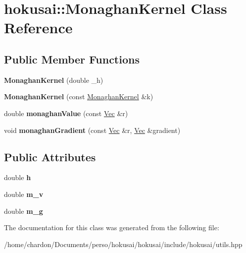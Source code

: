 \hypertarget{classhokusai_1_1MonaghanKernel}{\section{hokusai\+:\+:Monaghan\+Kernel Class Reference}
\label{classhokusai_1_1MonaghanKernel}
}
\subsection*{Public Member Functions}
\begin{DoxyCompactItemize}
\item 
\hypertarget{classhokusai_1_1MonaghanKernel_a5d44cd7ae2e0c0d27bbf3e9dd001ccf3}{{\bfseries Monaghan\+Kernel} (double \+\_\+h)}\label{classhokusai_1_1MonaghanKernel_a5d44cd7ae2e0c0d27bbf3e9dd001ccf3}

\item 
\hypertarget{classhokusai_1_1MonaghanKernel_a0d96366720449895e98773ecc66a8b0c}{{\bfseries Monaghan\+Kernel} (const \hyperlink{classhokusai_1_1MonaghanKernel}{Monaghan\+Kernel} \&k)}\label{classhokusai_1_1MonaghanKernel_a0d96366720449895e98773ecc66a8b0c}

\item 
\hypertarget{classhokusai_1_1MonaghanKernel_ae8b604de820017f1203ddae10d891e45}{double {\bfseries monaghan\+Value} (const \hyperlink{classhokusai_1_1Vec3}{Vec} \&r)}\label{classhokusai_1_1MonaghanKernel_ae8b604de820017f1203ddae10d891e45}

\item 
\hypertarget{classhokusai_1_1MonaghanKernel_ab6fca0322a39129c9566e49cbdc0fd45}{void {\bfseries monaghan\+Gradient} (const \hyperlink{classhokusai_1_1Vec3}{Vec} \&r, \hyperlink{classhokusai_1_1Vec3}{Vec} \&gradient)}\label{classhokusai_1_1MonaghanKernel_ab6fca0322a39129c9566e49cbdc0fd45}

\end{DoxyCompactItemize}
\subsection*{Public Attributes}
\begin{DoxyCompactItemize}
\item 
\hypertarget{classhokusai_1_1MonaghanKernel_ac95c037ea31b35f472071321262e6daa}{double {\bfseries h}}\label{classhokusai_1_1MonaghanKernel_ac95c037ea31b35f472071321262e6daa}

\item 
\hypertarget{classhokusai_1_1MonaghanKernel_aee600df0a66bc1943556e453f0061fa7}{double {\bfseries m\+\_\+v}}\label{classhokusai_1_1MonaghanKernel_aee600df0a66bc1943556e453f0061fa7}

\item 
\hypertarget{classhokusai_1_1MonaghanKernel_a8788c5bc9398465037e667797a1b247c}{double {\bfseries m\+\_\+g}}\label{classhokusai_1_1MonaghanKernel_a8788c5bc9398465037e667797a1b247c}

\end{DoxyCompactItemize}


The documentation for this class was generated from the following file\+:\begin{DoxyCompactItemize}
\item 
/home/chardon/\+Documents/perso/hokusai/hokusai/include/hokusai/utils.\+hpp\end{DoxyCompactItemize}

